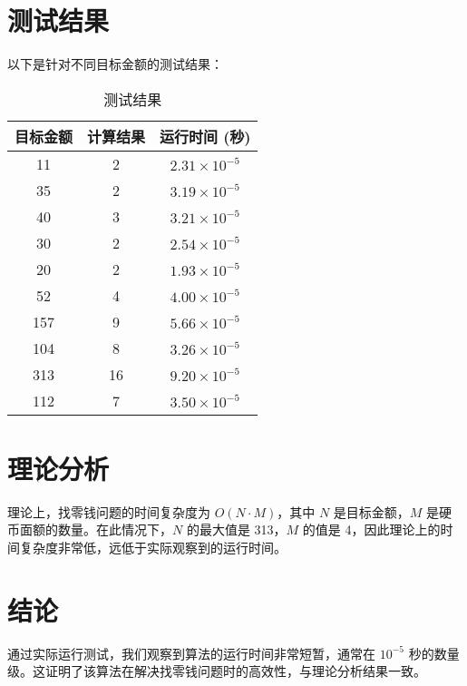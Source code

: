\documentclass[twoside,a4paper,10pt]{article}
\begin{document}
\pagestyle{fancy}
\fancyhead{}
\rhead{\today}

\section{测试结果}

以下是针对不同目标金额的测试结果：

\begin{table}[h]
\centering
\begin{tabular}{|c|c|c|}
\hline
目标金额 & 计算结果 & 运行时间 (秒) \\
\hline
11 & 2 & $2.31 \times 10^{-5}$ \\
35 & 2 & $3.19 \times 10^{-5}$ \\
40 & 3 & $3.21 \times 10^{-5}$ \\
30 & 2 & $2.54 \times 10^{-5}$ \\
20 & 2 & $1.93 \times 10^{-5}$ \\
52 & 4 & $4.00 \times 10^{-5}$ \\
157 & 9 & $5.66 \times 10^{-5}$ \\
104 & 8 & $3.26 \times 10^{-5}$ \\
313 & 16 & $9.20 \times 10^{-5}$ \\
112 & 7 & $3.50 \times 10^{-5}$ \\
\hline
\end{tabular}
\caption{测试结果}
\end{table}

\section{理论分析}

理论上，找零钱问题的时间复杂度为 $O(N \cdot M)$，其中 $N$ 是目标金额，$M$ 是硬币面额的数量。在此情况下，$N$ 的最大值是 313，$M$ 的值是 4，因此理论上的时间复杂度非常低，远低于实际观察到的运行时间。

\section{结论}

通过实际运行测试，我们观察到算法的运行时间非常短暂，通常在 $10^{-5}$ 秒的数量级。这证明了该算法在解决找零钱问题时的高效性，与理论分析结果一致。
\end{document}

